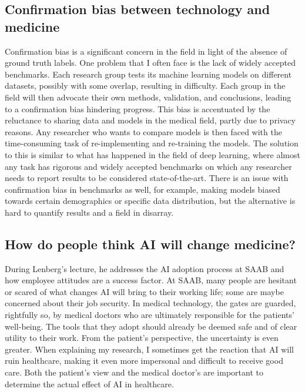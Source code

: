 \documentclass[a4paper, 11pt]{article}
\begin{document}
\subsection{Confirmation bias between technology and medicine}
Confirmation bias is a significant concern in the field in light of the absence of ground truth labels. One problem that I often face is the lack of widely accepted benchmarks. Each research group tests its machine learning models on different datasets, possibly with some overlap, resulting in difficulty. Each group in the field will then advocate their own methods, validation, and conclusions, leading to a confirmation bias hindering progress. This bias is accentuated by the reluctance to sharing data and models in the medical field, partly due to privacy reasons. Any researcher who wants to compare models is then faced with the time-consuming task of re-implementing and re-training the models. The solution to this is similar to what has happened in the field of deep learning, where almost any task has rigorous and widely accepted benchmarks on which any researcher needs to report results to be considered state-of-the-art. There is an issue with confirmation bias in benchmarks as well, for example, making models biased towards certain demographics or specific data distribution, but the alternative is hard to quantify results and a field in disarray.     


\subsection{How do people think AI will change medicine?}
During Lenberg's lecture, he addresses the AI adoption process at SAAB and how employee attitudes are a success factor. At SAAB, many people are hesitant or scared of what changes AI will bring to their working life; some are maybe concerned about their job security. In medical technology, the gates are guarded, rightfully so, by medical doctors who are ultimately responsible for the patients' well-being. The tools that they adopt should already be deemed safe and of clear utility to their work. From the patient's perspective, the uncertainty is even greater. When explaining my research, I sometimes get the reaction that AI will ruin healthcare, making it even more impersonal and difficult to receive good care. Both the patient's view and the medical doctor's are important to determine the actual effect of AI in healthcare. 
\end{document}
